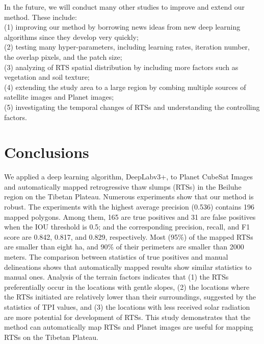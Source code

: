 \documentclass[preprint,12pt,authoryear]{elsarticle}
\begin{document}
In the future, we will conduct many other studies to improve and extend our method. These include:\\
 (1) improving our method by borrowing news ideas from new deep learning algorithms since they develop very quickly;\\ 
(2) testing many hyper-parameters, including learning rates, iteration number, the overlap pixels, and the patch size; \\
(3) analyzing of RTS spatial distribution by including more factors such as vegetation and soil texture;\\
(4) extending the study area to a large region by combing multiple sources of satellite images and Planet images; \\
(5) investigating the temporal changes of RTSs and understanding the controlling factors.


\section{Conclusions}
\label{sec_conclusion}

We applied a deep learning algorithm, DeepLabv3+, to Planet CubeSat Images and automatically mapped retrogressive thaw slumps (RTSs) in the Beiluhe region on the Tibetan Plateau. Numerous experiments show that our method is robust. The experiments with the highest average precision (0.536) contains 196 mapped polygons. Among them, 165 are true positives and 31 are false positives when the IOU threshold is 0.5; and the corresponding precision, recall, and F1 score are 0.842, 0.817, and 0.829, respectively. Most (95\%) of the mapped RTSs are smaller than eight ha, and 90\% of their perimeters are smaller than 2000 meters. The comparison between statistics of true positives and manual delineations shows that automatically mapped results show similar statistics to manual ones. Analysis of the terrain factors indicates that (1) the RTSs preferentially occur in the locations with gentle slopes, (2) the locations where the RTSs initiated are relatively lower than their surroundings, suggested by the statistics of TPI values, and (3) the locations with less received solar radiation are more potential for development of RTSs. This study demonstrates that the method can automatically map RTSs and Planet images are useful for mapping RTSs on the Tibetan Plateau. 
 
\end{document}
